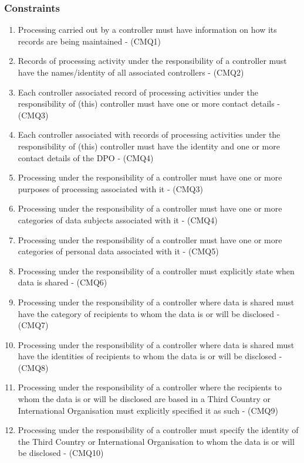 \subsubsection{Constraints}
\begin{enumerate}[label={\textit{C.\theenumi}}]
    \item Processing carried out by a controller must have information on how its records are being maintained - (CMQ1)
    \item Records of processing activity under the responsibility of a controller must have the names/identity of all associated controllers - (CMQ2)
    \item Each controller associated record of processing activities under the responsibility of (this) controller must have one or more contact details - (CMQ3)
    \item Each controller associated with records of processing activities under the responsibility of (this) controller must have the identity and one or more contact details of the DPO - (CMQ4)
    \item Processing under the responsibility of a controller must have one or more purposes of processing associated with it - (CMQ3)
    \item Processing under the responsibility of a controller must have one or more categories of data subjects associated with it - (CMQ4)
    \item Processing under the responsibility of a controller must have one or more categories of personal data associated with it - (CMQ5)
    \item Processing under the responsibility of a controller must explicitly state when data is shared - (CMQ6)
    \item Processing under the responsibility of a controller where data is shared must have the category of recipients to whom the data is or will be disclosed - (CMQ7)
    \item Processing under the responsibility of a controller where data is shared must have the identities of recipients to whom the data is or will be disclosed - (CMQ8)
    \item Processing under the responsibility of a controller where the recipients to whom the data is or will be disclosed are based in a Third Country or International Organisation must explicitly specified it as such - (CMQ9)
    \item Processing under the responsibility of a controller must specify the identity of the Third Country or International Organisation to whom the data is or will be disclosed - (CMQ10)

\end{enumerate}
